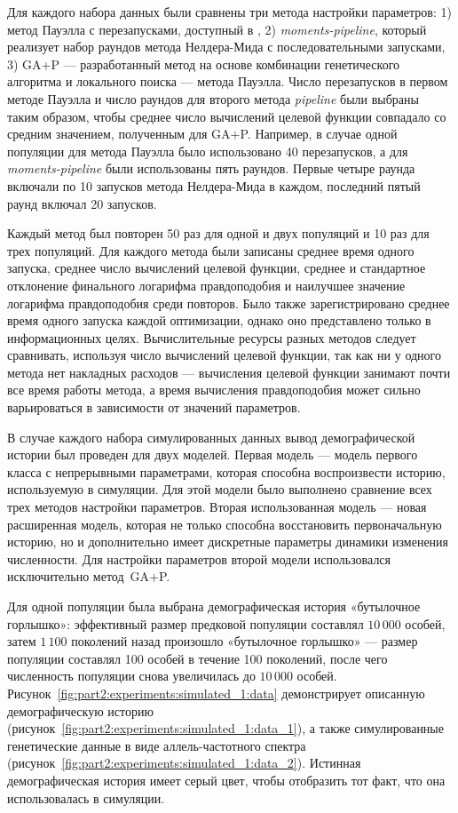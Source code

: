 Для каждого набора данных были сравнены три метода настройки параметров: 1) метод Пауэлла с перезапусками, доступный в \moments, 2) \textit{moments-pipeline}, который реализует набор раундов метода Нелдера-Мида с последовательными запусками, 3) GA+P --- разработанный метод на основе комбинации генетического алгоритма и локального поиска --- метода Пауэлла.
Число перезапусков в первом методе Пауэлла и число раундов для второго метода \textit{\dadi pipeline} были выбраны таким образом, чтобы среднее число вычислений целевой функции совпадало со средним значением, полученным для GA+P.
Например, в случае одной популяции для метода Пауэлла было использовано 40 перезапусков, а для \textit{moments-pipeline} были использованы пять раундов.
Первые четыре раунда включали по 10 запусков метода Нелдера-Мида в каждом, последний пятый раунд включал 20 запусков.

Каждый метод был повторен 50 раз для одной и двух популяций и 10 раз для трех популяций.
Для каждого метода были записаны среднее время одного запуска, среднее число вычислений целевой функции, среднее и стандартное отклонение финального логарифма правдоподобия и наилучшее значение логарифма правдоподобия среди повторов.
Было также зарегистрировано среднее время одного запуска каждой оптимизации, однако оно представлено только в информационных целях.
Вычислительные ресурсы разных методов следует сравнивать, используя число вычислений целевой функции, так как ни у одного метода нет накладных расходов --- вычисления целевой функции занимают почти все время работы метода, а время вычисления правдоподобия может сильно варьироваться в зависимости от значений параметров.

В случае каждого набора симулированных данных вывод демографической истории был проведен для двух моделей.
Первая модель --- модель первого класса с непрерывными параметрами, которая способна воспроизвести историю, используемую в симуляции.
Для этой модели было выполнено сравнение всех трех методов настройки параметров.
Вторая использованная модель --- новая расширенная модель, которая не только способна восстановить первоначальную историю, но и дополнительно имеет дискретные параметры динамики изменения численности.
Для настройки параметров второй модели использовался исключительно метод~GA+P.

Для одной популяции была выбрана демографическая история «бутылочное горлышко»: эффективный размер предковой популяции составлял $10{\,}000$ особей, затем $1{\,}100$ поколений назад произошло «бутылочное горлышко» --- размер популяции составлял 100 особей в течение 100 поколений, после чего численность популяции снова увеличилась до $10{\,}000$ особей.
Рисунок~\ref{fig:part2:experiments:simulated_1:data} демонстрирует описанную демографическую историю (рисунок~\ref{fig:part2:experiments:simulated_1:data_1}), а также симулированные генетические данные в виде аллель-частотного спектра (рисунок~\ref{fig:part2:experiments:simulated_1:data_2}).
Истинная демографическая история имеет серый цвет, чтобы отобразить тот факт, что она использовалась в симуляции.


